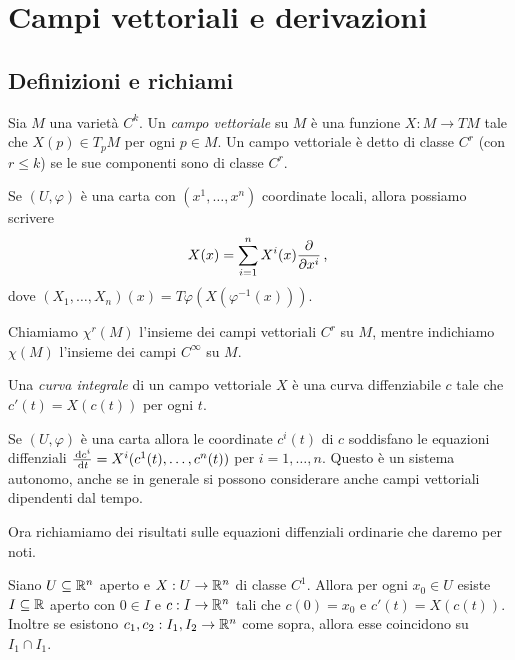 \chapter{Campi vettoriali e derivazioni}

\section{Definizioni e richiami}

\begin{definition} 
	Sia $M$ una varietà $C^k$. Un \emph{campo vettoriale} su $M$ è una funzione $X:M\to TM$ tale che $X(p)\in T_pM$ per ogni $p\in M$. Un campo vettoriale è detto di classe $C^r$ (con $r\le k$) se le sue componenti sono di classe $C^r$.
\end{definition}

Se $(U,\varphi)$ è una carta con $(x^1,\dots,x^n)$ coordinate locali, allora possiamo scrivere
\begin{equation*}
	X(x)=\sum_{i=1}^nX^i(x)\frac{\partial}{\partial x^i}\, \text{, }
\end{equation*}
dove $(X_1,\dots,X_n)(x)=T\varphi(X(\varphi^{-1}(x)))$.

 
Chiamiamo $\chi^r(M)$ l'insieme dei campi vettoriali $C^r$ su $M$, mentre indichiamo $\chi(M)$ l'insieme dei campi $C^\infty$ su $M$.
 
\begin{definition} 
	Una \emph{curva integrale} di un campo vettoriale $X$ è una curva diffenziabile $c$ tale che $c'(t)=X(c(t))$ per ogni $t$.
\end{definition}

Se $(U,\varphi)$ è una carta allora le coordinate $c^i(t)$ di $c$ soddisfano le equazioni diffenziali $\frac{\,\mathrm d c^i}{\,\mathrm d t}=X^i(c^1(t),\dots,c^n(t))$ per $i=1,\dots,n$. Questo è un sistema autonomo, anche se in generale si possono considerare anche campi vettoriali dipendenti dal tempo.
 
Ora richiamiamo dei risultati sulle equazioni diffenziali ordinarie che daremo per noti.
 
\begin{theorem}  
	Siano $U\subseteq\mathbb R^n$ aperto e $X:U\to\mathbb R^n$ di classe $C^1$. Allora per ogni $x_0\in U$ esiste $I\subseteq\mathbb R$ aperto con $0\in I$ e $c:I\to\mathbb R^n$ tali che $c(0)=x_0$ e $c'(t)=X(c(t))$. Inoltre se esistono $c_1,c_2:I_1,I_2\to\mathbb R^n$ come sopra, allora esse coincidono su $I_1\cap I_1$.
\end{theorem}

